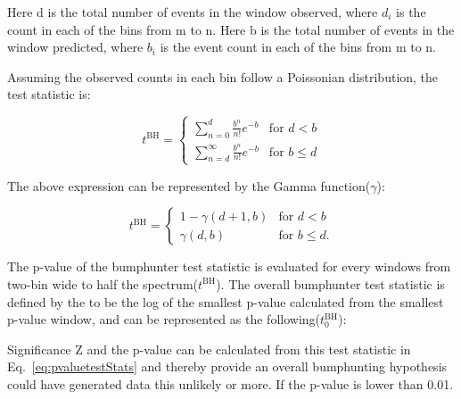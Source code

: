     Here d is the total number of events in the window observed, where $d_i$ is the count in each of the bins from m to n. 
    Here b is the total number of events in the window predicted, where $b_i$ is the event count in each of the bins from m to n.
    
    Assuming the observed counts in each bin follow a Poissonian distribution, the test statistic is:

\begin{equation}
    t^{\textrm{BH}}=
    \begin{cases} \sum_{n=0}^{d} \frac{b^{n}}{n!} e^{-b} &  \textrm{for $d < b$}
    \\
    \sum_{n=d}^{\infty} \frac{b^n}{n!} e^{-b} &  \textrm{for $b \leq d$}
    \end{cases}
\end{equation}

    The above expression can be represented by the Gamma function($\gamma$): 

\begin{equation}
    t^{\textrm{BH}}=
    \begin{cases} 1-\gamma(d+1, b) &  \textrm{for $d < b$}
    \\
    \gamma(d,b) &  \textrm{for $b \leq d$}.
    \end{cases}
\end{equation}
    

    The p-value of the bumphunter test statistic is evaluated for every windows from two-bin wide to half the spectrum($t^{\textrm{BH}}$). The overall bumphunter test statistic is defined by the to be the log of the smallest p-value calculated from the smallest p-value window, and can be represented as the following($t^{\textrm{BH}}_{0}$):


    Significance Z and the p-value can be calculated from this test statistic in Eq.~\ref{eq:pvaluetestStats} and thereby provide an overall bumphunting hypothesis could have generated data this unlikely or more. If the p-value is lower than 0.01. %


